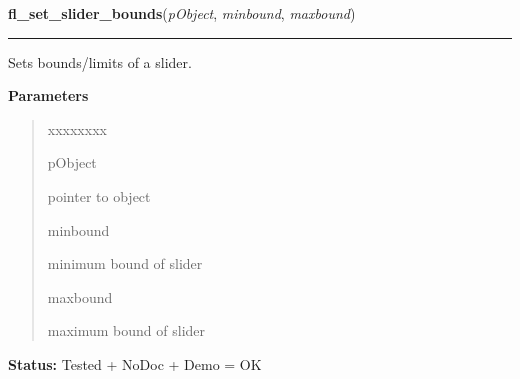 \hspace{.8\funcindent}\begin{boxedminipage}{\funcwidth}

    \raggedright \textbf{fl\_set\_slider\_bounds}(\textit{pObject}, \textit{minbound}, \textit{maxbound})

    \vspace{-1.5ex}

    \rule{\textwidth}{0.5\fboxrule}
\setlength{\parskip}{2ex}
    Sets bounds/limits of a slider.

\setlength{\parskip}{1ex}
      \textbf{Parameters}
      \vspace{-1ex}

      \begin{quote}
        \begin{Ventry}{xxxxxxxx}

          \item[pObject]

          pointer to object

          \item[minbound]

          minimum bound of slider

          \item[maxbound]

          maximum bound of slider

        \end{Ventry}

      \end{quote}

\textbf{Status:} Tested + NoDoc + Demo = OK



    \end{boxedminipage}

    \label{xformslib:library:fl_get_slider_bounds}

    \vspace{0.5ex}

